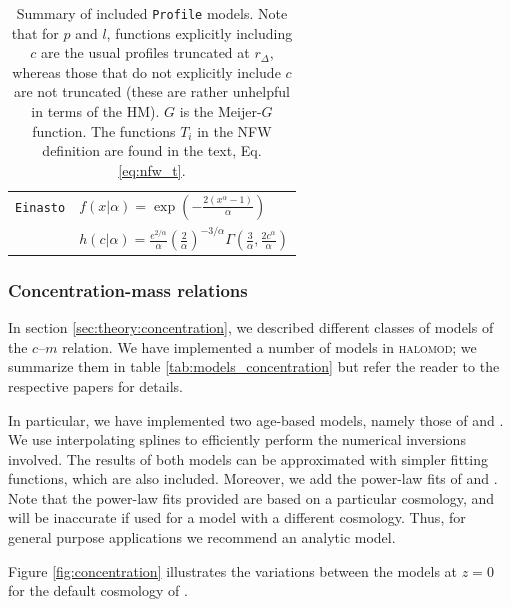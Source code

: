 \documentclass[5p,aas_macros]{elsarticle}
\newcommand{\halomod}{\textsc{halomod}}
\begin{document}
\begin{table}
\begin{tabular}{ m{4cm} m{12cm}}
\texttt{Einasto} & $\displaystyle f(x|\alpha) = \exp\left(-\frac{2(x^\alpha - 1)}{\alpha}\right)$\\
\citet{Einasto1965} & $\displaystyle  h(c|\alpha) = \frac{e^{2 / \alpha}}{\alpha} \left(\frac{2}{\alpha}\right)^{-3/\alpha} \Gamma\left(\frac{3}{\alpha}, \frac{2 c^\alpha}{\alpha}\right)$\\

\bottomrule
\end{tabular}
\caption[Summary of included \texttt{Profile} models]{Summary of included \texttt{Profile} models. Note that for $p$ and $l$, functions explicitly including $c$ are the usual profiles truncated at $r_\Delta$, whereas those that do not explicitly include $c$ are not truncated (these are rather unhelpful in terms of the HM). $G$ is the Meijer-$G$ function. The functions $T_i$ in the NFW definition are found in the text, Eq. \ref{eq:nfw_t}.}
\label{tab:models_profile}
\end{table}

\endgroup




\subsubsection{Concentration-mass relations}
\label{sec:halomod:components:concentration}
In section \ref{sec:theory:concentration}, we described different classes of models of the $c$--$m$ relation. We have implemented a number of models in \halomod; we summarize them in table \ref{tab:models_concentration} but refer the reader to the respective papers for details.

In particular, we have implemented two age-based models, namely those of \citet{Bullock2001} and \citet{Ludlow2016}. We use interpolating splines to efficiently perform the numerical inversions involved. The results of both models can be approximated with simpler fitting functions, which are also included. Moreover, we add the power-law fits of \citet{Duffy2008} and \citet{Zehavi2011}. 
Note that the power-law fits provided are based on a particular cosmology, and will be inaccurate if used for a model with a different cosmology. Thus, for general purpose applications we recommend an analytic model. 

Figure \ref{fig:concentration} illustrates the variations between the models at $z=0$ for the default cosmology of \cite{PlanckCollaboration2015}. 
\end{document}
